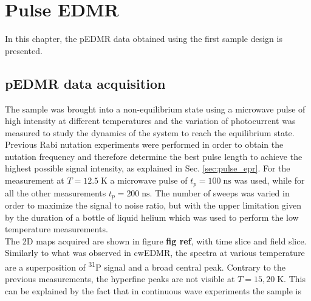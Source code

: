 \documentclass[a4paper]{book}
\begin{document}
	\chapter{Pulse EDMR}
	In this chapter, the pEDMR data obtained using the first sample design is presented.
	
	\section{pEDMR data acquisition}
	The sample was brought into a non-equilibrium state using a microwave pulse of high intensity at different temperatures and the variation of photocurrent was measured to study the dynamics of the system to reach the equilibrium state. Previous Rabi nutation experiments were performed in order to obtain the nutation frequency and therefore determine the best pulse length to achieve the highest possible signal intensity, as explained in Sec. \ref{sec:pulse_epr}. For the measurement at $T = 12.5 \; \text{K}$ a microwave pulse of $t_p = 100 \; \text{ns}$ was used, while for all the other measurements $t_p = 200 \; \text{ns}$. The number of sweeps was varied in order to maximize the signal to noise ratio, but with the upper limitation given by the duration of a bottle of liquid helium which was used to perform the low temperature measurements.\\
	The 2D maps acquired are shown in figure \textbf{fig ref}, with time slice and field slice.\\
	Similarly to what was observed in cwEDMR, the spectra at various temperature are a superposition of \textsuperscript{31}P signal and a broad central peak. Contrary to the previous measurements, the hyperfine peaks are not visible at $T = 15, 20 \; \text{K}$. This can be explained by the fact that in continuous wave experiments the sample is 
	\printbibliography
\end{document}
